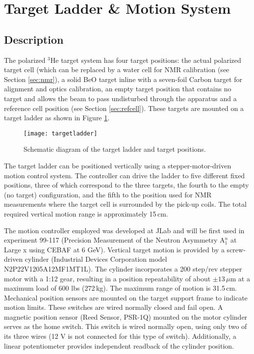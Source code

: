 \section{Target Ladder \& Motion System}
\label{sec:motion}

\subsection{Description}


        The polarized $^3$He target system has four target positions:
the actual polarized target cell (which can be replaced by a water
cell for NMR calibration (see Section \ref{sec:nmr}), a solid
BeO target inline with a seven-foil Carbon target for alignment and
optics calibration, an empty target position that contains no target
and allows the beam to pass undisturbed through the apparatus and 
a reference cell position (see Section \ref{sec:refcell}).
These targets are mounted on a target ladder as shown in Figure
\ref{fig:tgtladder}.

\begin{figure}
\begin{center}
\texttt{[image: targetladder]}
\caption{Schematic diagram of the target ladder and target positions.}
\label{fig:tgtladder}
\end{center}
\end{figure}

        The target ladder can be positioned vertically using a  
stepper-motor-driven motion control system.  The controller can drive the
ladder to five different fixed positions, three of which correspond to
the three targets, the fourth to the empty (no target) configuration,
and the fifth to the position used for NMR measurements where the
target cell is surrounded by the pick-up coils.  The total required
vertical motion range is approximately 15\,cm.

        The motion controller employed was developed at JLab and will
be first used in experiment 99-117 (Precision Measurement of the Neutron
Asymmetry A$_1^n$ at Large x using CEBAF at 6 GeV).  Vertical target motion 
is provided by a screw-driven cylinder (Industrial Devices Corporation model
N2P22V1205A12MF1MT1L).  The cylinder incorporates a 200 step/rev 
stepper motor with a 1:12 gear, resulting in a position repeatability 
of about $\pm 13 \,\mu$m at a maximum load of 600 lbs (272\,kg). 
The maximum range of motion is 31.5\,cm.  Mechanical position 
sensors are mounted on the target support frame to indicate motion
limits.  These switches are wired normally closed and fail
open.  A magnetic position sensor (Reed Sensor, PSR-1Q) mounted 
on the motor cylinder serves as the home switch.  This switch is
wired normally open, using only two of its three wires (12 V is not 
connected for this type of switch).  Additionally, a linear 
potentiometer provides independent readback of the cylinder position.

